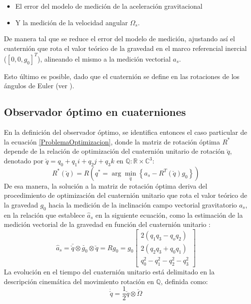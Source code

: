 \documentclass[conference]{IEEEtran}
\begin{document}
\begin{itemize}
\item El error del modelo de medición de la aceleración gravitacional 
\item Y la medición de la velocidad angular $\Omega_s$.
\end{itemize}
De manera tal que se reduce el error del modelo de medición, ajustando así el cuaternión que rota el valor teórico de la gravedad en el marco referencial inercial ($[0,0,g_0]^T$), alineando el mismo a la medición vectorial $a_s$.\par
Esto último es posible, dado que el cuaternión se define en las rotaciones de los ángulos de Euler (ver \cite{Altmann1986}).\par
\subsection{Observador óptimo en cuaterniones}
En la definición del observador óptimo, se identifica entonces el caso particular de la ecuación \ref{ProblemaOptimizacion}, donde la matriz de rotación óptima $R^*$ depende de la relación de optimización del cuaternión unitario de rotación $\breve{q}$, denotado por $\breve{q}=q_0+q_1i+q_2j+q_3k$ en $\mathbb{Q}:\mathbb{R}\times\mathbb{C}^3$:
\begin{equation}\label{ProblemaOptimizacionAcc}
R^*(\breve{q})=R\left(q^*=\arg\min_{\breve{q}}\left\{a_s-R^T(\breve{q})g_0\right\}\right)
\end{equation} 
De esa manera, la solución a la matriz de rotación óptima deriva del procedimiento de optimización del cuaternión unitario que rota el valor teórico de la gravedad $g_0$ hacia la medición de la inclinación campo vectorial gravitatorio $a_s$, en la relación que establece $\hat{a}_s$ en la siguiente ecuación, como la estimación de la medición vectorial de la gravedad en función del cuaternión unitario \cite{Sola2012}:
\begin{equation}\label{chap2:ModeloMedicion}
\hat{a}_s=\bar{\breve{q}}\otimes\breve{g_0}\otimes\breve{q}=Rg_0=g_0\begin{bmatrix}2(q_1q_3-q_oq_2)\\2(q_2q_3+q_0q_1)\\q_0^2-q_1^2-q_2^2-q_3^2\end{bmatrix}
\end{equation}
La evolución en el tiempo del cuaternión unitario está delimitado en la descripción cinemática del movimiento rotación en $\mathbb{Q}$, definida como:
\begin{equation}\label{modelo2}
\dot{\breve{q}}=\frac{1}{2}\breve{q}\otimes\breve{\Omega}
\end{equation}
\end{document}
